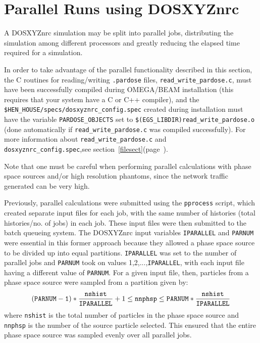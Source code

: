 \documentclass[12pt,twoside]{article}      %
\newcommand{\indexm}[1]{\index{#1}}
\begin{document}
\indexm{Parallel runs}
\section{Parallel Runs using DOSXYZnrc}
\label{parallelcalc}

A DOSXYZnrc simulation may be split into parallel jobs, distributing the
simulation among different processors and greatly reducing the elapsed time
required for a simulation.

In order to take advantage of the parallel functionality described in this
section, the C routines for reading/writing {\tt .pardose}
files,
{\tt read\_write\_pardose.c}, must have been successfully
compiled during OMEGA/BEAM
installation (this requires that your system have a C or C++ compiler), and
the {\tt \$HEN\_HOUSE/specs/dosxyznrc\_config.spec} created during
installation must have the variable {\tt PARDOSE\_OBJECTS}
set to {\tt \$(EGS\_LIBDIR)read\_write\_pardose.o} (done automatically
if {\tt read\_write\_pardose.c} was compiled successfully).  For more
information about {\tt read\_write\_pardose.c} and {\tt
dosxyznrc\_config.spec},see section~\ref{filesect}(page~\pageref{filesect}).

Note that one must
be careful when performing parallel calculations with phase space sources
and/or high resolution
phantoms, since the network traffic generated can be very high.

\indexm{pprocess}
Previously, parallel calculations were submitted using the
{\tt pprocess} script, which created separate input files for
each job, with the same number of histories
(total histories/no. of jobs) in each job.  These input files were
then submitted to the batch queueing system.  The DOSXYZnrc
\indexm{IPARALLEL}
\indexm{PARNUM}
input variables {\tt IPARALLEL} and {\tt PARNUM} were essential
in this former approach because they allowed a phase space source to be
divided up into equal partitions.  {\tt IPARALLEL} was set to the
number of parallel jobs and {\tt PARNUM} took on values
1,2,...,{\tt IPARALLEL}, with each input file having a different
value of {\tt PARNUM}.  For a given input file, then, particles from
a phase space source were sampled from a partition given by:
\begin{equation*}
({\tt PARNUM-1})*\frac{{\tt nshist}}{{\tt IPARALLEL}}+1 \leq {\tt nnphsp} \leq
{\tt PARNUM}*\frac{{\tt nshist}}{{\tt IPARALLEL}}
\end{equation*}
where {\tt nshist} is the total number of particles in the phase space source
and {\tt nnphsp} is the number of the source particle selected.  This ensured
that the entire phase space source was sampled evenly over all parallel
jobs.
\end{document}
